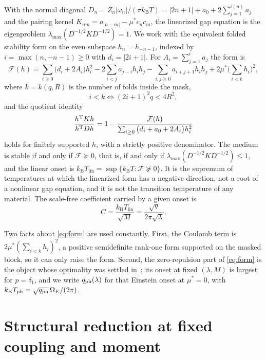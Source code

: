 \documentclass[11pt]{article}
\newcommand{\kb}{k_{\mathrm B}}
\newcommand{\Tlin}{T_{\mathrm{lin}}}
\newcommand{\OmE}{\Omega_E}
\newcommand{\Fcal}{\mathcal F}
\newcommand{\muS}{\mu^{*}}
\theoremstyle{definition}
\theoremstyle{remark}
\begin{document}
With the normal diagonal $D_n=Z_n|\omega_n|/(\pi\kb T)=|2n+1|+a_0+2\sum_{j=1}^{i(n)}a_j$ and the
pairing kernel $K_{nm}=a_{|n-m|}-\muS c_nc_m$, the linearized gap equation is the
eigenproblem $\lambda_{\max}(D^{-1/2}KD^{-1/2})=1$. We work with the equivalent folded
stability form on the even subspace $h_n=h_{-n-1}$, indexed by
$i=\max(n,-n-1)\ge0$ with $d_i=|2i+1|$. For $A_i=\sum_{j=1}^{i}a_j$ the form is
\begin{equation}\label{eq:form}
\Fcal(h)=\sum_{i\ge0}\big(d_i+2A_i\big)h_i^2
-2\sum_{i<j}a_{j-i}h_ih_j
-\sum_{i,j\ge0}a_{i+j+1}h_ih_j
+2\muS\Big(\sum_{i<k}h_i\Big)^2 ,
\end{equation}
where $k=k(q,R)$ is the number of folds inside the mask,
\begin{equation}\label{eq:mask}
i<k\iff (2i+1)^2q<4R^2 ,
\end{equation}
and the quotient identity
\begin{equation}\label{eq:quotient}
\frac{h^{\rm T}Kh}{h^{\rm T}Dh}
=1-\frac{\Fcal(h)}{\sum_{i\ge0}\big(d_i+a_0+2A_i\big)h_i^2}
\end{equation}
holds for finitely supported $h$, with a strictly positive denominator. The medium is
stable if and only if $\Fcal\succeq0$, that is, if and only if
$\lambda_{\max}(D^{-1/2}KD^{-1/2})\le1$, and the linear onset is
$\kb\Tlin=\sup\{\kb T:\Fcal\not\succeq0\}$. It is the supremum of temperatures at which the
linearized form has a negative direction, not a root of a nonlinear gap equation, and it
is not the transition temperature of any material. The scale-free coefficient carried by
a given onset is
\begin{equation}\label{eq:C}
C=\frac{\kb\Tlin}{\sqrt M}=\frac{\sqrt q}{2\pi\sqrt\lambda}.
\end{equation}

Two facts about \eqref{eq:form} are used constantly. First, the Coulomb term is
$2\muS(\sum_{i<k}h_i)^2$, a positive semidefinite rank-one form supported on the masked
block, so it can only raise the form. Second, the zero-repulsion part of \eqref{eq:form}
is the object whose optimality was settled in~\cite{rens,kondratev}: its onset at fixed
$(\lambda,M)$ is largest for $p=\delta_1$, and we write $q_{\rm ph}(\lambda)$ for that
Einstein onset at $\muS=0$, with $\kb T_{\rm ph}=\sqrt{q_{\rm ph}}\,\OmE/(2\pi)$.

\section{Structural reduction at fixed coupling and moment}\label{sec:reduce}
\end{document}
